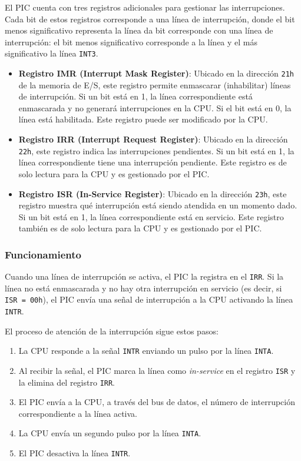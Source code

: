 \documentclass[12pt,oneside]{templates/unerthesis}
\providecommand{\tightlist}{%
  \setlength{\itemsep}{0pt}\setlength{\parskip}{0pt}}
\begin{document}
El PIC cuenta con tres registros adicionales para gestionar las interrupciones. Cada bit de estos registros corresponde a una línea de interrupción, donde el bit menos significativo representa la línea da bit corresponde con una línea de interrupción: el bit menos significativo corresponde a la línea y el más significativo la línea \texttt{INT3}.

\begin{itemize}
\item
  \textbf{Registro IMR (Interrupt Mask Register)}: Ubicado en la dirección \texttt{21h} de la memoria de E/S, este registro permite enmascarar (inhabilitar) líneas de interrupción. Si un bit está en 1, la línea correspondiente está enmascarada y no generará interrupciones en la CPU. Si el bit está en 0, la línea está habilitada. Este registro puede ser modificado por la CPU.
\item
  \textbf{Registro IRR (Interrupt Request Register)}: Ubicado en la dirección \texttt{22h}, este registro indica las interrupciones pendientes. Si un bit está en 1, la línea correspondiente tiene una interrupción pendiente. Este registro es de solo lectura para la CPU y es gestionado por el PIC.
\item
  \textbf{Registro ISR (In-Service Register)}: Ubicado en la dirección \texttt{23h}, este registro muestra qué interrupción está siendo atendida en un momento dado. Si un bit está en 1, la línea correspondiente está en servicio. Este registro también es de solo lectura para la CPU y es gestionado por el PIC.
\end{itemize}

\hypertarget{funcionamiento}{%
\subsubsection{Funcionamiento}\label{funcionamiento}}

Cuando una línea de interrupción se activa, el PIC la registra en el \texttt{IRR}. Si la línea no está enmascarada y no hay otra interrupción en servicio (es decir, si \texttt{ISR\ =\ 00h}), el PIC envía una señal de interrupción a la CPU activando la línea \texttt{INTR}.

El proceso de atención de la interrupción sigue estos pasos:

\begin{enumerate}
\def\labelenumi{\arabic{enumi}.}
\tightlist
\item
  La CPU responde a la señal \texttt{INTR} enviando un pulso por la línea \texttt{INTA}.
\item
  Al recibir la señal, el PIC marca la línea como \emph{in-service} en el registro \texttt{ISR} y la elimina del registro \texttt{IRR}.
\item
  El PIC envía a la CPU, a través del bus de datos, el número de interrupción correspondiente a la línea activa.
\item
  La CPU envía un segundo pulso por la línea \texttt{INTA}.
\item
  El PIC desactiva la línea \texttt{INTR}.
\end{enumerate}
\end{document}
